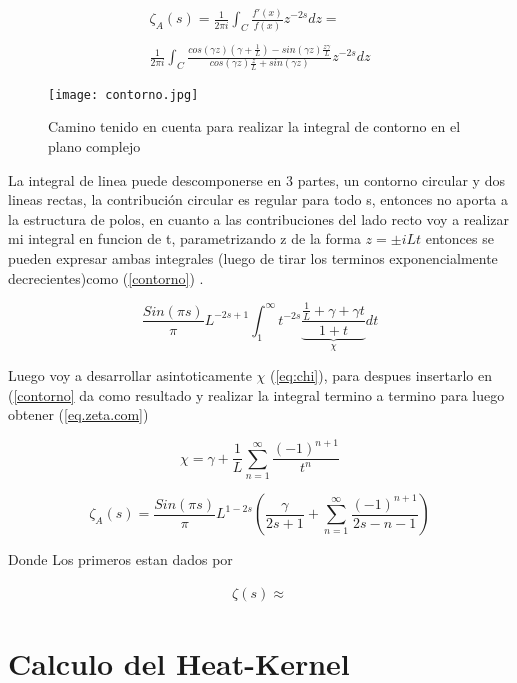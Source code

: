 \begin{equation}
\begin{array}{c}
   \zeta _A (s) =  \frac{1}{2 \pi i} \int _{C} \frac{f'(x)}{f(x)} z ^{-2s} dz = \\ 
   \\ 
    \frac{1}{2 \pi i} \int _{C}
    \frac{ cos(\gamma z) \left(\gamma + \frac{1}{L} \right) - sin(\gamma z) \frac{z \gamma}{L}
    }
    {cos(\gamma z) \frac{z}{L} + sin(\gamma z)
    }
    z ^{-2 s} dz
\end{array}
\end{equation}




\begin{figure}
\centering
\texttt{[image: contorno.jpg]}
\caption{Camino tenido en cuenta para realizar la integral de contorno en el plano complejo}
\label{fig:contorno}
\end{figure}


La integral de linea puede descomponerse en 3 partes, un contorno circular y dos lineas rectas, la contribución circular es regular para todo s, entonces no aporta a la estructura de polos, en cuanto a las contribuciones del lado recto voy a realizar mi integral en funcion de t, parametrizando z de la forma $z = \pm i L t$ entonces se pueden expresar ambas integrales (luego de tirar los terminos exponencialmente decrecientes)como  (\ref{contorno}) .

\begin{equation}
    \frac{Sin(\pi s)}{ \pi } L ^{-2s+1}
    \int _1 ^{\infty} 
    t ^{-2s}
    \underbrace
    {
	\frac{ \frac{1}{L} + \gamma + \gamma t}
	{1+ t}
	} _{\chi}
    dt 
\label{contorno}
\end{equation}

Luego voy a desarrollar asintoticamente  $\chi$  (\ref{eq:chi}), para despues insertarlo en (\ref{contorno} da como resultado y realizar la integral termino a termino para luego obtener (\ref{eq.zeta.com})

\begin{equation}
    \chi = \gamma + \frac{1}{L} \sum _{n=1} ^{\infty} \frac{(-1) ^{n+1}}{t ^n}
\label{eq:chi}
\end{equation}

\begin{equation}
    \zeta _A (s) = 
    \frac{Sin(\pi s)}{\pi} L ^{1-2s}
    \left(
    \frac{\gamma}{2s+1} + 
    \sum _{n=1} ^{\infty}
    \frac{(-1) ^{n+1}}{2s-n-1}
    \right)
\label{eq.zeta.com}
\end{equation}

Donde Los primeros estan dados por 

\begin{equation}
\begin{array}{c}

\zeta(s) \approx 

\end{array}
\end{equation}

\section{Calculo del Heat-Kernel}
